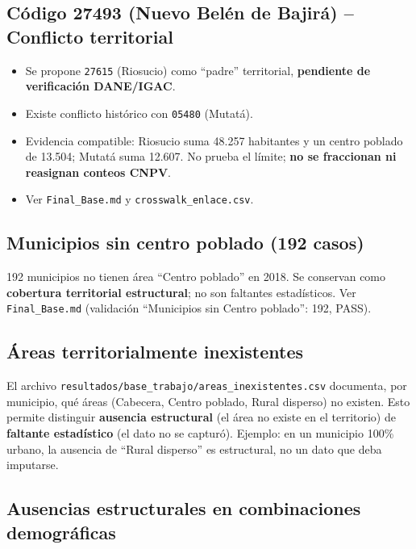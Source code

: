 \subsection{Código 27493 (Nuevo Belén de Bajirá) -- Conflicto territorial}
\label{sec:27493}

\begin{itemize}
    \item Se propone \texttt{27615} (Riosucio) como ``padre'' territorial, \textbf{pendiente de verificación DANE/IGAC}.
    \item Existe conflicto histórico con \texttt{05480} (Mutatá).
    \item Evidencia compatible: Riosucio suma 48.257 habitantes y un centro poblado de 13.504; Mutatá suma 12.607. No prueba el límite; \textbf{no se fraccionan ni reasignan conteos CNPV}.
    \item Ver \texttt{Final\_Base.md} y \texttt{crosswalk\_enlace.csv}.
\end{itemize}

\subsection{Municipios sin centro poblado (192 casos)}
\label{sec:sin_centro_poblado}

192 municipios no tienen área ``Centro poblado'' en 2018. Se conservan como \textbf{cobertura territorial estructural}; no son faltantes estadísticos. Ver \texttt{Final\_Base.md} (validación ``Municipios sin Centro poblado'': 192, PASS).

\subsection{Áreas territorialmente inexistentes}
\label{sec:areas_inexistentes}

El archivo \texttt{resultados/base\_trabajo/areas\_inexistentes.csv} documenta, por municipio, qué áreas (Cabecera, Centro poblado, Rural disperso) no existen. Esto permite distinguir \textbf{ausencia estructural} (el área no existe en el territorio) de \textbf{faltante estadístico} (el dato no se capturó). Ejemplo: en un municipio 100\% urbano, la ausencia de ``Rural disperso'' es estructural, no un dato que deba imputarse.

\subsection{Ausencias estructurales en combinaciones demográficas}
\label{sec:ausencias_estructurales}

